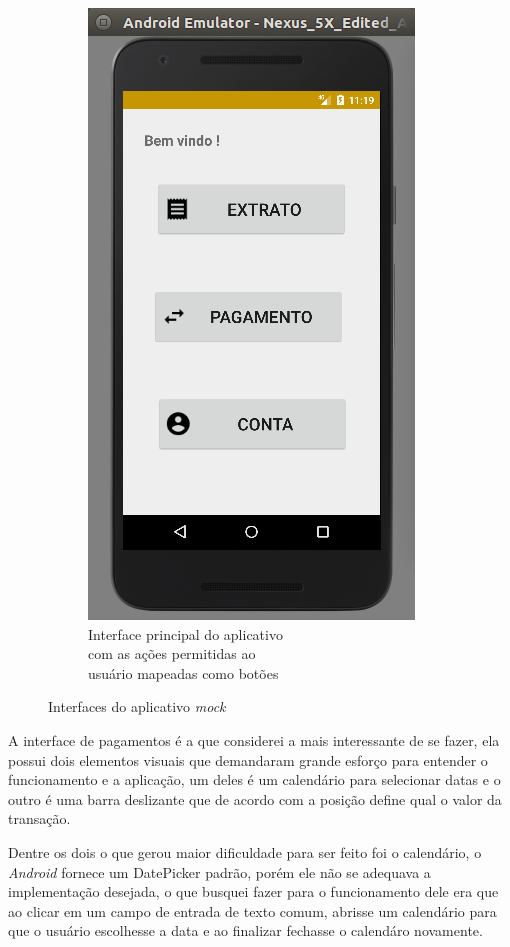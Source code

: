 \documentclass[hidelinks,12pt]{article}
\begin{document}
\begin{figure}[H]
\begin{subfigure}{0.5\textwidth}
		\includegraphics[scale=0.5]{int:main}
		\caption{Interface principal do aplicativo\\\hspace{\textwidth}com as a\c{c}\~oes permitidas ao\\\hspace{\textwidth}usu\'ario mapeadas como bot\~oes}
		\label{int:main}
	\end{subfigure}
	\caption{Interfaces do aplicativo \textit{mock}}
	\label{loginmain}
\end{figure}

A interface de pagamentos \'e a que considerei a mais interessante de se fazer, ela possui dois elementos visuais que demandaram grande esfor\c{c}o para entender o funcionamento e a aplica\c{c}\~ao, um deles \'e um calend\'ario para selecionar datas e o outro \'e uma barra deslizante que de acordo com a posi\c{c}\~ao define qual o valor da transa\c{c}\~ao.

Dentre os dois o que gerou maior dificuldade para ser feito foi o calend\'ario, o \textit{Android} fornece um DatePicker padr\~ao, por\'em ele n\~ao se adequava a implementa\c{c}\~ao desejada, o que busquei fazer para o funcionamento dele era que ao clicar em um campo de entrada de texto comum, abrisse um calend\'ario para que o usu\'ario escolhesse a data e ao finalizar fechasse o calend\'aro novamente.
\end{document}
